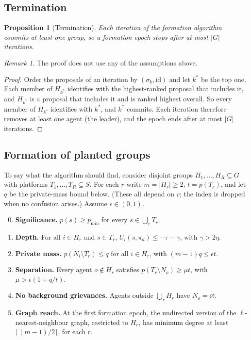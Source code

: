 \documentclass[11pt]{article}
\theoremstyle{plain}
\newtheorem{proposition}[theorem]{Proposition}
\theoremstyle{definition}
\theoremstyle{remark}
\newtheorem{remark}[theorem]{Remark}
\begin{document}
\subsection{Termination}
\begin{proposition}[Termination]\label{prop:term}
Each iteration of the formation algorithm commits at least one group, so a formation epoch stops after at most $|G|$ iterations.
\end{proposition}
\begin{remark}
The proof does not use any of the assumptions above.
\end{remark}
\begin{proof}
Order the proposals of an iteration by $(\sigma_k,\text{id})$ and let $k^*$ be the top one. Each member of $H_{k^*}$ identifies with the highest-ranked proposal that includes it, and $H_{k^*}$ is a proposal that includes it and is ranked highest overall.
So every member of $H_{k^*}$ identifies with $k^*$, and $k^*$ commits. Each iteration therefore removes at least one agent (the leader), and the epoch ends after at most $|G|$ iterations.
\end{proof}
 
\subsection{Formation of planted groups}
To say what the algorithm should find, consider disjoint groups $H_1,\dots,H_R\subseteq G$ with platforms $T_1,\dots,T_R\subseteq S$.
For each $r$ write $m=|H_r|\ge2$, $t=p(T_r)$, and let $q$ be the private-mass bound below. (These all depend on $r$; the index is dropped when no confusion arises.) Assume $\epsilon\in(0,1)$.
 
\begin{enumerate}[label=\textbf{(P\arabic*)},leftmargin=3.2em,itemsep=4pt]
    \setcounter{enumi}{-1}
    \item \textbf{Significance.} $p(s)\ge p_{\min}$ for every $s\in\bigcup_rT_r$.
    \item \textbf{Depth.} For all $i\in H_r$ and $s\in T_r$, $U_i(s,\pi_d)\le-\tau-\gamma$, with $\gamma>2\eta$.
    \item \textbf{Private mass.} $p(N_i\setminus T_r)\le q$ for all $i\in H_r$, with $(m-1)q\le\epsilon t$.
    \item \textbf{Separation.} Every agent $o\notin H_r$ satisfies $p(T_r\setminus N_o)\ge\mu t$, with $\mu>\epsilon(1+q/t)$.
    \item \textbf{No background grievances.} Agents outside $\bigcup_rH_r$ have $N_o=\varnothing$.
    \item[\textbf{(G)}] \textbf{Graph reach.} At the first formation epoch, the undirected version of the $\ell$-nearest-neighbour graph, restricted to $H_r$,
          has minimum degree at least $\lceil(m-1)/2\rceil$, for each $r$.
\end{enumerate}
 
\end{document}
